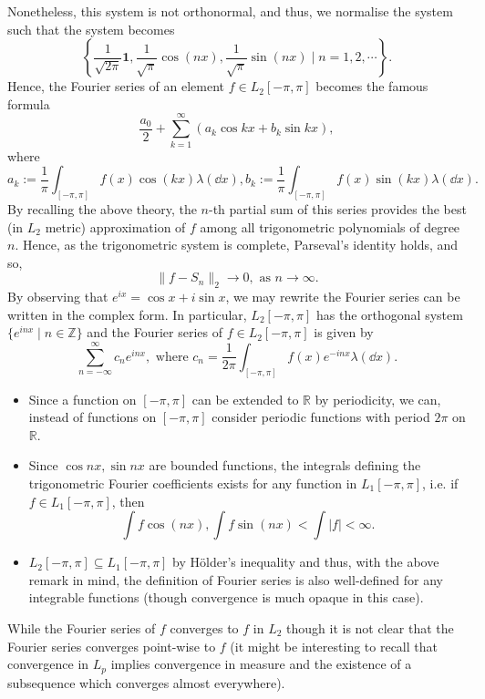 \documentclass[]{article}
\theoremstyle{definition}
\theoremstyle{definition}
\begin{document}
Nonetheless, this system is not orthonormal, and thus, we normalise the system 
such that the system becomes 
\[\left\{\frac{1}{\sqrt{2\pi}}\mathbf{1}, \frac{1}{\sqrt{\pi}}\cos(n x), \frac{1}{\sqrt{\pi}}\sin(n x) \mid n = 1, 2, \cdots\right\}.\]
Hence, the Fourier series of an element \(f \in L_2[-\pi, \pi]\) becomes the 
famous formula
\[\frac{a_0}{2} + \sum_{k = 1}^\infty (a_k \cos kx + b_k \sin k x),\]
where 
\[a_k := \frac{1}{\pi}\int_{[-\pi, \pi]} f(x) \cos(k x) \lambda(\dd x),
  b_k := \frac{1}{\pi}\int_{[-\pi, \pi]} f(x) \sin(k x) \lambda(\dd x).\]
By recalling the above theory, the \(n\)-th partial sum of this series provides the best 
(in \(L_2\) metric) approximation of \(f\) among all trigonometric polynomials 
of degree \(n\). Hence, as the trigonometric system is complete, Parseval's 
identity holds, and so, 
\[\|f - S_n\|_2 \to 0, \text{ as } n \to \infty.\]
By observing that \(e^{ix} = \cos x + i\sin x\), we may rewrite the Fourier series 
can be written in the complex form. In particular, \(L_2[-\pi, \pi]\) has the 
orthogonal system \(\{e^{inx} \mid n \in \mathbb{Z}\}\) and the Fourier series 
of \(f \in L_2[-\pi, \pi]\) is given by 
\[\sum_{n = -\infty}^\infty c_n e^{inx}, \text{ where }
  c_n = \frac{1}{2\pi} \int_{[-\pi, \pi]} f(x)e^{-inx}\lambda(\dd x).\]
\begin{itemize}
  \item Since a function on \([-\pi, \pi]\) can be extended to \(\mathbb{R}\) by periodicity, 
    we can, instead of functions on \([-\pi, \pi]\) consider periodic functions with 
    period \(2\pi\) on \(\mathbb{R}\).
  \item Since \(\cos nx, \sin nx\) are bounded functions, the integrals defining 
    the trigonometric Fourier coefficients exists for any function in \(L_1[-\pi, \pi]\), 
    i.e. if \(f \in L_1[-\pi, \pi]\), then 
    \[\int f \cos(nx), \int f\sin(nx) < \int |f| < \infty.\]
  \item \(L_2[-\pi, \pi] \subseteq L_1[-\pi, \pi]\) by Hölder's inequality and thus,
    with the above remark in mind, the definition of Fourier series is also well-defined 
    for any integrable functions (though convergence is much opaque in this case).
\end{itemize}
While the Fourier series of \(f\) converges to \(f\) in \(L_2\) though it 
is not clear that the Fourier series converges point-wise to \(f\) 
(it might be interesting to recall that convergence in \(L_p\) implies convergence 
in measure and the existence of a subsequence which converges almost everywhere).  
\end{document}
